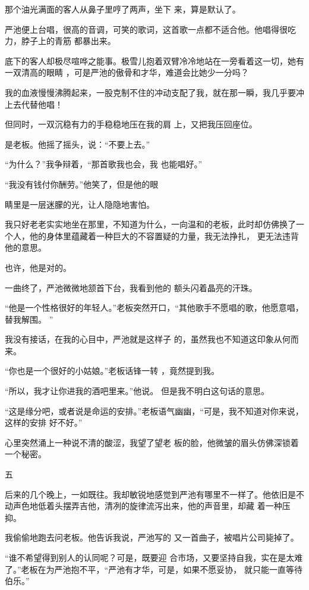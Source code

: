 \documentclass{article}
\begin{document}
那个油光满面的客人从鼻子里哼了两声，坐下
来，算是默认了。 

\newpage

严池便上台唱，很高的音调，可笑的歌词，这首歌一点都不适合他。他唱得很吃力，脖子上的青筋
都暴出来。 

底下的客人却极尽喧哗之能事。极雪儿抱着双臂冷冷地站在一旁看着这一切，她有一双清高的眼睛
，可是严池的傲骨和才华，难道会比她少一分吗？ 

我的血液慢慢沸腾起来，一股克制不住的冲动支配了我，就在那一瞬，我几乎要冲上去代替他唱！

但同时，一双沉稳有力的手稳稳地压在我的肩
上，又把我压回座位。 


是老板。他摇了摇头，说：“不要上去。” 

“为什么？”我争辩着，“那首歌我也会，我
也能唱好。” 

“我没有钱付你酬劳。”他笑了，但是他的眼

\newpage
睛里是一层迷朦的光，让人隐隐地害怕。 

我只好老老实实地坐在那里，不知道为什么，一向温和的老板，此时却仿佛换了一个人，他的身体里蕴藏着一种巨大的不容置疑的力量，我无法挣扎，
更无法违背他的意思。 


也许，他是对的。 

一曲终了，严池微微地颔首下台，我看到他的
额头闪着晶亮的汗珠。 

“他是一个性格很好的年轻人。”老板突然开口，“其他歌手不愿唱的歌，他愿意唱，替我解围。
” 

我没有接话，在我的心目中，严池就是这样子
的，虽然我也不知道这印象从何而来。 

“你也是一个很好的小姑娘。”老板话锋一转
，竟然提到我。 

\newpage

“所以，我才让你进我的酒吧里来。”他说。
但是我不明白这句话的意思。 

“这是缘分吧，或者说是命运的安排。”老板语气幽幽，“可是，我不知道对你来说，这样的安排
好不好。” 

心里突然涌上一种说不清的酸涩，我望了望老
板的脸，他微皱的眉头仿佛深锁着一个秘密。 


五 

后来的几个晚上，一如既往。我却敏锐地感觉到严池有哪里不一样了。他依旧是不动声色地低着头摆弄吉他，清冽的旋律流泻出来，他的声音里，却藏
着一种压抑。 

我偷偷地跑去问老板。他告诉我说，严池写的
又一首曲子，被唱片公司毙掉了。 

“谁不希望得到别人的认同呢？可是，既要迎
\newpage
合市场，又要坚持自我，实在是太难了。”老板在为严池抱不平，“严池有才华，可是，如果不愿妥协，
就只能一直等待伯乐。” 
\end{document}
